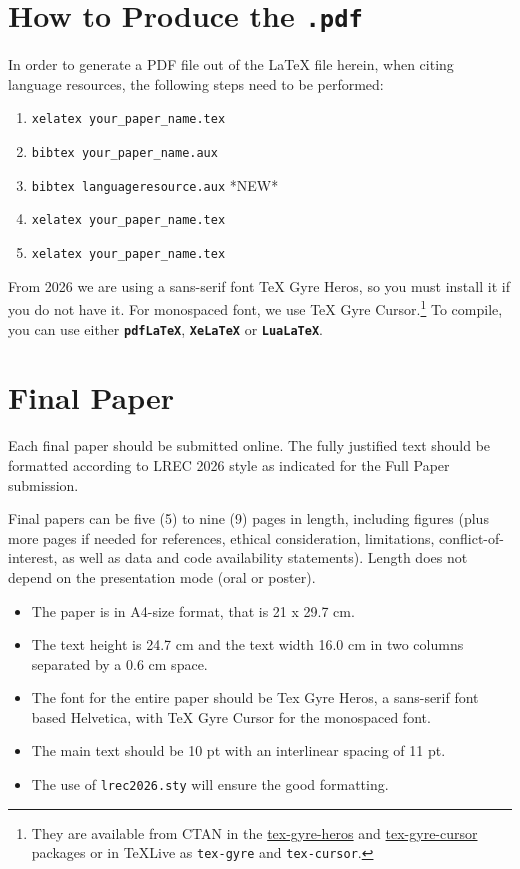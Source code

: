 \documentclass[10pt, a4paper]{article}
\begin{document}
\section{How to Produce the \texttt{.pdf}}
\label{sec:append-how-prod}


In order to generate a PDF file out of the LaTeX file herein, when citing language resources, the following steps need to be performed:

\begin{enumerate}
\item \texttt{xelatex your\_paper\_name.tex}
\item \texttt{bibtex your\_paper\_name.aux}
\item \texttt{bibtex languageresource.aux}    *NEW*
\item \texttt{xelatex your\_paper\_name.tex}
\item \texttt{xelatex your\_paper\_name.tex}
\end{enumerate}

From 2026 we are using a sans-serif font TeX Gyre Heros, so you must
install it if you do not have it.  For monospaced font, we use TeX
Gyre Cursor.\footnote{They are available from CTAN in the
  \href{https://ctan.org/pkg/tex-gyre-heros}{tex-gyre-heros} and
  \href{https://ctan.org/pkg/tex-gyre-cursor}{tex-gyre-cursor} packages
    or in TeXLive as \texttt{tex-gyre} and \texttt{tex-cursor}.}  To
  compile, you can use either \textbf{\texttt{pdfLaTeX}},
  \textbf{\texttt{XeLaTeX}} or \textbf{\texttt{LuaLaTeX}}.

\section{Final Paper}

Each final paper should be submitted online. The fully justified text should be formatted according to LREC 2026 style as indicated for the Full Paper submission.

Final papers can be five (5) to nine (9)  pages in length, including figures (plus more pages if needed for references, ethical consideration, limitations, conflict-of-interest, as well as data and code availability statements).  
Length does not depend on the presentation mode (oral or poster).

\begin{itemize}
\item The paper is in A4-size format, that is 21 x 29.7 cm.
\item The text height is 24.7 cm and the text width 16.0 cm in two
  columns separated by a 0.6 cm space.
\item The font for the entire paper should be Tex Gyre Heros, a
  sans-serif font based Helvetica, with TeX Gyre Cursor for the
  monospaced font.
\item The main text should be 10 pt with an interlinear spacing of 11
  pt.
\item The use of \texttt{lrec2026.sty} will ensure the good formatting.
\end{itemize}
\end{document}
